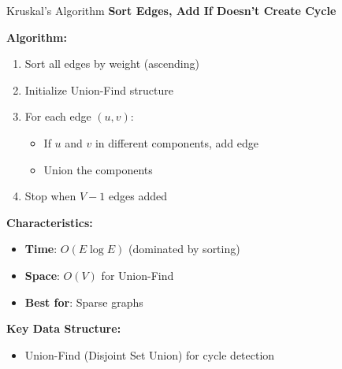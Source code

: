 \documentclass[aspectratio=169]{beamer}
\begin{document}
\begin{frame}{Kruskal's Algorithm}
  \textbf{Sort Edges, Add If Doesn't Create Cycle}

  \vspace{0.3cm}
  \textbf{Algorithm:}
  \begin{enumerate}
    \item Sort all edges by weight (ascending)
    \item Initialize Union-Find structure
    \item For each edge $(u, v)$:
    \begin{itemize}
      \item If $u$ and $v$ in different components, add edge
      \item Union the components
    \end{itemize}
    \item Stop when $V-1$ edges added
  \end{enumerate}

  \vspace{0.3cm}
  \textbf{Characteristics:}
  \begin{itemize}
    \item \textbf{Time}: $O(E \log E)$ (dominated by sorting)
    \item \textbf{Space}: $O(V)$ for Union-Find
    \item \textbf{Best for}: Sparse graphs
  \end{itemize}

  \vspace{0.3cm}
  \textbf{Key Data Structure:}
  \begin{itemize}
    \item Union-Find (Disjoint Set Union) for cycle detection
  \end{itemize}
\end{frame}
\end{document}
